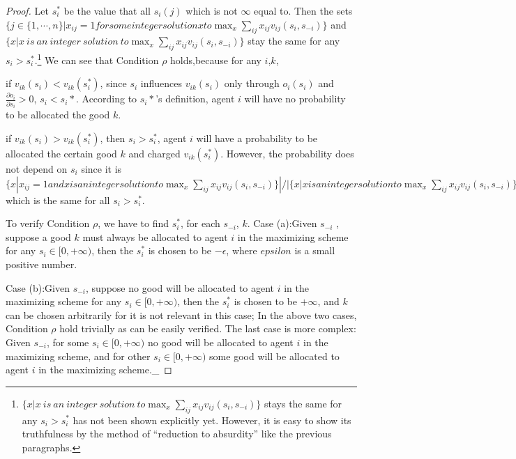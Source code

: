 \begin{proof}
 Let $s_i^*$ be the value that all $s_i(j)$ which is not $\infty$ equal to. Then the sets $\{j \in  \{1,\cdots,n\}| x_{ij}=1 for some integer
 solution x to \max_x\sum_{ij}x_{ij}v_{ij}(s_i,s_{-i})\}$ and $\{x| x\ is\ an\ integer\
 solution\ to \max_x\sum_{ij}x_{ij}v_{ij}(s_i,s_{-i})\}$ stay the same for any $s_i > s_i^*$.\footnote{$\{x| x\ is\ an\ integer\
 solution\ to \max_x\sum_{ij}x_{ij}v_{ij}(s_i,s_{-i})\}$ stays the same for any $s_i > s_i^*$ has not been shown explicitly yet. However, it is easy to show its truthfulness by the method of ``reduction to absurdity'' like the previous paragraphs.}
 We can see that Condition $\rho$ holds,because for any $i$,$k$,
 
 if $v_{ik}(s_i) < v_{ik}(s_i^*)$,  since $s_i$ influences $v_{ik}(s_i)$ only through $o_{i}(s_i)$ and  $\frac{\partial o_i}{\partial s_i} > 0$, $s_i < s_i*$. According to $s_i*$'s definition, agent $i$ will have no probability to be allocated the good $k$. %

 if $v_{ik}(s_i) > v_{ik}(s_i^*)$, then $s_i > s_i^*$, agent $i$ will have a probability to be allocated the certain good $k$ and charged $ v_{ik}(s_i^*)$. However, the probability does not depend on $s_i$ since it is $\{x| x_{ij}=1 and x is an integer
 solution to \max_x\sum_{ij}x_{ij}v_{ij}(s_i,s_{-i}) \}|/|\{x| x is an integer
 solution to \max_x\sum_{ij}x_{ij}v_{ij}(s_i,s_{-i}) \}|$ which is the same for all $s_i > s_i^*$.

 

 
 

 

To verify Condition $\rho$, we have to find $s_i^*$, for each $s_{-i}$, $k$.
Case (a):Given $s_{-i}$ , suppose a good $k$ must always be allocated to agent $i$ in the maximizing scheme for any $s_i \in [0,+\infty)$,  then the $s_i^*$ is chosen to be $-\epsilon$, where $epsilon$ is a small positive number.%

Case (b):Given $s_{-i} $, suppose no good will be allocated to agent $i$ in the maximizing scheme for any $s_i \in [0,+\infty)$, then the $s_i^*$ is chosen to be $+\infty$, and $k$ can be chosen arbitrarily for it is not relevant in this case;
In the above two cases, Condition $\rho$ hold trivially as can be easily verified. The last case is more complex:
Given $s_{-i}$, for some $s_i \in [0,+\infty)$ no good will be allocated to agent $i$ in the maximizing scheme, and for other $s_i \in [0,+\infty)$ some good will be allocated to agent $i$ in the maximizing scheme._

 


\end{proof}